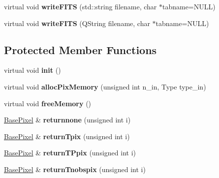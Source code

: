 \begin{DoxyCompactItemize}
\item 
\hypertarget{classSkymap_ab81c3181ba74f9f42ff6001c2bf073e3}{
virtual void {\bfseries writeFITS} (std::string filename, char $\ast$tabname=NULL)}
\label{classSkymap_ab81c3181ba74f9f42ff6001c2bf073e3}

\item 
\hypertarget{classSkymap_a63347708ce65ddf8679c28f137ed3171}{
virtual void {\bfseries writeFITS} (QString filename, char $\ast$tabname=NULL)}
\label{classSkymap_a63347708ce65ddf8679c28f137ed3171}

\end{DoxyCompactItemize}
\subsection*{Protected Member Functions}
\begin{DoxyCompactItemize}
\item 
\hypertarget{classSkymap_a3f889eb836eb3b1ae2758d7692859f77}{
virtual void {\bfseries init} ()}
\label{classSkymap_a3f889eb836eb3b1ae2758d7692859f77}

\item 
\hypertarget{classSkymap_a4b53f27820d8298ddf6a8e331c37ee43}{
virtual void {\bfseries allocPixMemory} (unsigned int n\_\-in, Type type\_\-in)}
\label{classSkymap_a4b53f27820d8298ddf6a8e331c37ee43}

\item 
\hypertarget{classSkymap_a73f5439e0e214d0c18d1f28e089bfcf6}{
virtual void {\bfseries freeMemory} ()}
\label{classSkymap_a73f5439e0e214d0c18d1f28e089bfcf6}

\item 
\hypertarget{classSkymap_a6335881c7ddd4326d72391c507075dc6}{
\hyperlink{classBasePixel}{BasePixel} \& {\bfseries returnnone} (unsigned int i)}
\label{classSkymap_a6335881c7ddd4326d72391c507075dc6}

\item 
\hypertarget{classSkymap_a3d87a23a19b193ffd4489ab5795ae94d}{
\hyperlink{classBasePixel}{BasePixel} \& {\bfseries returnTpix} (unsigned int i)}
\label{classSkymap_a3d87a23a19b193ffd4489ab5795ae94d}

\item 
\hypertarget{classSkymap_a05cd60e4b26f3612c6c7779d583cc3ae}{
\hyperlink{classBasePixel}{BasePixel} \& {\bfseries returnTPpix} (unsigned int i)}
\label{classSkymap_a05cd60e4b26f3612c6c7779d583cc3ae}

\item 
\hypertarget{classSkymap_a3985e322e7ed7ca59abcc27408ed53dc}{
\hyperlink{classBasePixel}{BasePixel} \& {\bfseries returnTnobspix} (unsigned int i)}
\label{classSkymap_a3985e322e7ed7ca59abcc27408ed53dc}


\end{DoxyCompactItemize}
